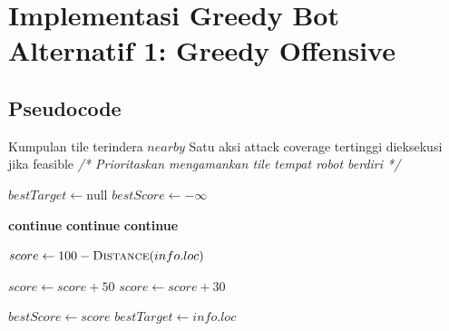 \section{Implementasi Greedy Bot Alternatif 1: Greedy Offensive}

\subsection{Pseudocode}

\begin{breakablealgorithm}
	\caption{Greedy Offensive Territory Push pada SoldierBot}
	\label{alg:alt1-soldier-paint}
	\begin{algorithmic}[1]
		\Require Kumpulan tile terindera $nearby$
		\Ensure Satu aksi attack coverage tertinggi dieksekusi jika feasible
		\Statex \textit{/* Prioritaskan mengamankan tile tempat robot berdiri */}
		\State {}
		\State \Return
		\EndIf

		\State $bestTarget \gets \text{null}$
		\State $bestScore \gets -\infty$

		\State \textbf{continue}
		\EndIf
		\State \textbf{continue}
		\EndIf
		\State \textbf{continue}
		\EndIf

		\State $score \gets 100 - \Call{Distance}{info.loc}$

		\State $score \gets score + 50$
		\State $score \gets score + 30$
		\EndIf

		\State $bestScore \gets score$
		\State $bestTarget \gets info.loc$
		\EndIf
		\EndFor

		\State {}
		\EndIf
		\EndFunction
	\end{algorithmic}
\end{breakablealgorithm}


